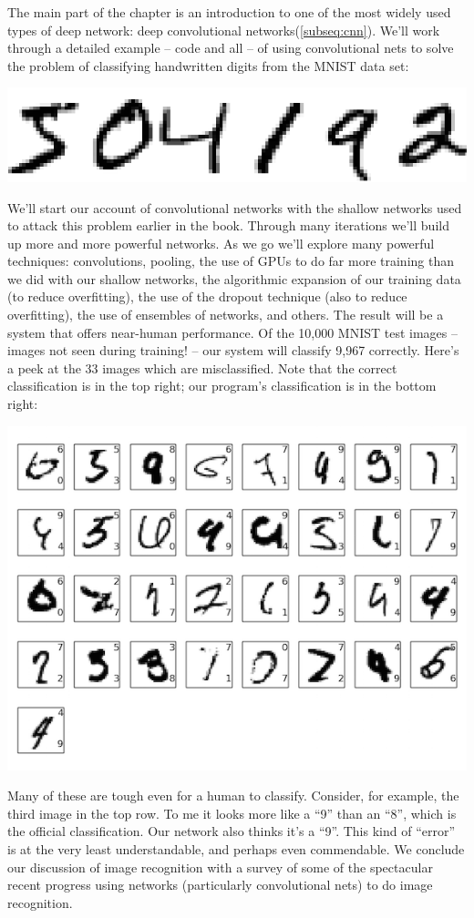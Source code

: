 \documentclass[a4paper,twoside,10pt]{book}
\begin{document}
The main part of the chapter is an introduction to one of the most widely used types of deep network: deep convolutional networks(\ref{subseq:cnn}). We'll work through a detailed example -- code and all -- of using convolutional nets to solve the problem of classifying handwritten digits from the MNIST data set:
\begin{center}
	\includegraphics[width=0.4\linewidth]{figures/ch1/digits}
\end{center}
We'll start our account of convolutional networks with the shallow networks used to attack this problem earlier in the book. Through many iterations we'll build up more and more powerful networks. As we go we'll explore many powerful techniques: convolutions, pooling, the use of GPUs to do far more training than we did with our shallow networks, the algorithmic expansion of our training data (to reduce overfitting), the use of the dropout technique (also to reduce overfitting), the use of ensembles of networks, and others. The result will be a system that offers near-human performance. Of the 10,000 MNIST test images -- images not seen during training! -- our system will classify 9,967 correctly. Here's a peek at the 33 images which are misclassified. Note that the correct classification is in the top right; our program's classification is in the bottom right:
\begin{center}
	\includegraphics[width=0.8\linewidth]{figures/ch6/ensemble_errors}
\end{center}
Many of these are tough even for a human to classify. Consider, for example, the third image in the top row. To me it looks more like a ``9'' than an ``8'', which is the official classification. Our network also thinks it's a ``9''. This kind of ``error'' is at the very least understandable, and perhaps even commendable. We conclude our discussion of image recognition with a survey of some of the spectacular recent progress using networks (particularly convolutional nets) to do image recognition.
\end{document}
